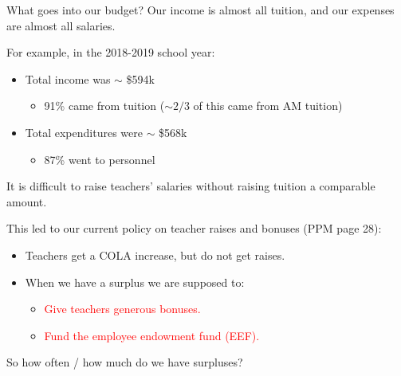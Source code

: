 \documentclass[8pt]{beamer}
\begin{document}
\begin{frame}{What goes into our budget?}
%
Our income is almost all tuition, and our expenses are almost all salaries.

For example, in the 2018-2019 school year:
%
\begin{itemize}
%
\item Total income was $\sim$ \$594k
\begin{itemize}
    \item 91\% came from tuition ($\sim 2/3$ of this came from AM tuition)
\end{itemize}
%
\item Total expenditures were $\sim$ \$568k
\begin{itemize}
    \item 87\% went to personnel
\end{itemize}
%
\end{itemize}
%

It is difficult to raise teachers' salaries without
raising tuition a comparable amount.

This led to our current policy on teacher raises and bonuses (PPM page 28):

%
\begin{itemize}
%
\item Teachers get a COLA increase, but do not get raises.
\item  When we have a surplus we are supposed to:
\begin{itemize}
\item \textcolor{red}{Give teachers generous bonuses.}
\item \textcolor{red}{Fund the employee endowment fund (EEF).}
\end{itemize}
%
\end{itemize}
%

So how often / how much do we have surpluses?

%
\end{frame}
\end{document}
